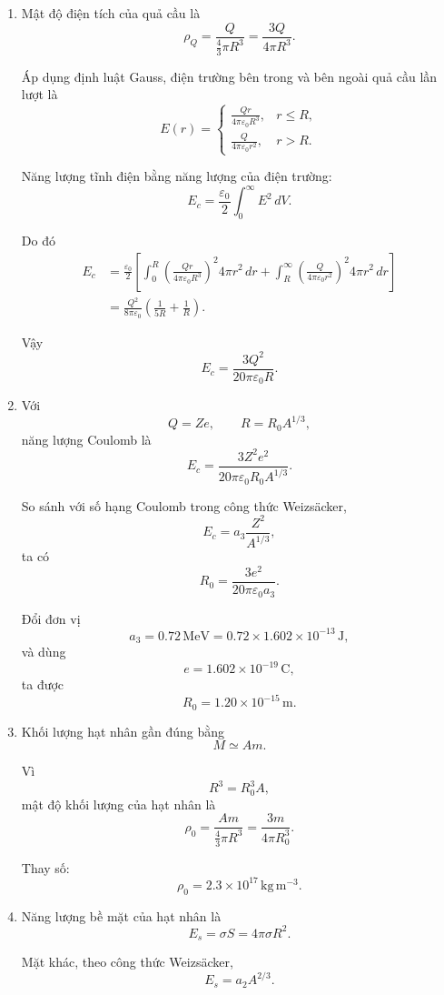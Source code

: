 \documentclass[12pt,a4paper]{article}
\begin{document}
\begin{enumerate}[leftmargin=*,itemsep=1em]

\item
Mật độ điện tích của quả cầu là
$$
\rho_Q=\frac{Q}{\frac43\pi R^3}
=\frac{3Q}{4\pi R^3}.
$$

Áp dụng định luật Gauss, điện trường bên trong và bên ngoài quả cầu lần lượt là
$$
E(r)=
\begin{cases}
\displaystyle \frac{Qr}{4\pi\varepsilon_0R^3},&r\leq R,\\[2mm]
\displaystyle \frac{Q}{4\pi\varepsilon_0r^2},&r>R.
\end{cases}
$$

Năng lượng tĩnh điện bằng năng lượng của điện trường:
$$
E_c=\frac{\varepsilon_0}{2}\int_{0}^{\infty}E^2\,dV.
$$

Do đó
$$
\begin{aligned}
E_c
&=\frac{\varepsilon_0}{2}
\left[
\int_0^R
\left(\frac{Qr}{4\pi\varepsilon_0R^3}\right)^2
4\pi r^2\,dr
+\int_R^\infty
\left(\frac{Q}{4\pi\varepsilon_0r^2}\right)^2
4\pi r^2\,dr
\right]\\
&=\frac{Q^2}{8\pi\varepsilon_0}
\left(\frac{1}{5R}+\frac{1}{R}\right).
\end{aligned}
$$

Vậy
$$
E_c=\frac{3Q^2}{20\pi\varepsilon_0R}.
$$

\item
Với
$$
Q=Ze,
\qquad
R=R_0A^{1/3},
$$
năng lượng Coulomb là
$$
E_c
=\frac{3Z^2e^2}{20\pi\varepsilon_0R_0A^{1/3}}.
$$

So sánh với số hạng Coulomb trong công thức Weizs\"acker,
$$
E_c=a_3\frac{Z^2}{A^{1/3}},
$$
ta có
$$
R_0=\frac{3e^2}{20\pi\varepsilon_0a_3}.
$$

Đổi đơn vị
$$
a_3=0.72\,\mathrm{MeV}
=0.72\times1.602\times10^{-13}\,\mathrm J,
$$
và dùng
$$
e=1.602\times10^{-19}\,\mathrm C,
$$
ta được
$$
R_0=1.20\times10^{-15}\,\mathrm m.
$$

\item
Khối lượng hạt nhân gần đúng bằng
$$
M\simeq Am.
$$

Vì
$$
R^3=R_0^3A,
$$
mật độ khối lượng của hạt nhân là
$$
\rho_0
=\frac{Am}{\frac43\pi R^3}
=\frac{3m}{4\pi R_0^3}.
$$

Thay số:
$$
\rho_0
=2.3\times10^{17}\,\mathrm{kg\,m^{-3}}.
$$

\item
Năng lượng bề mặt của hạt nhân là
$$
E_s=\sigma S=4\pi\sigma R^2.
$$

Mặt khác, theo công thức Weizs\"acker,
$$
E_s=a_2A^{2/3}.
$$


\end{enumerate}
\end{document}
